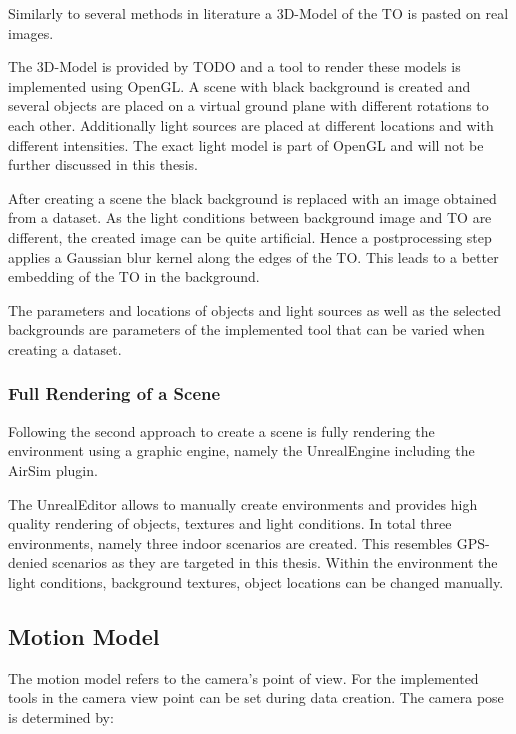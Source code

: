 Similarly to several methods in literature \cite{Girshick2013, Peng, Rozantsev} a 3D-Model of the \ac{TO} is pasted on real images.

The 3D-Model is provided by TODO and a tool to render these models is implemented using OpenGL. A scene with black background is created and several objects are placed on a virtual ground plane with different rotations to each other. Additionally light sources are placed at different locations and with different intensities. The exact light model is part of OpenGL and will not be further discussed in this thesis. 

After creating a scene the black background is replaced with an image obtained from a dataset. As the light conditions between background image and \ac{TO} are different, the created image can be quite artificial. Hence a postprocessing step applies a Gaussian blur kernel along the edges of the \ac{TO}. This leads to a better embedding of the \ac{TO} in the background.

The parameters and locations of objects and light sources as well as the selected backgrounds are parameters of the implemented tool that can be varied when creating a dataset.

\subsubsection{Full Rendering of a Scene}

Following \cite{Ros2016, Gaidon2016, Johnson-Roberson2016, Tobin2017, Tremblay2018a} the second approach to create a scene is fully rendering the environment using a graphic engine, namely the UnrealEngine including the AirSim plugin.

The UnrealEditor allows to manually create environments and provides high quality rendering of objects, textures and light conditions. In total three environments, namely three indoor scenarios are created. This resembles GPS-denied scenarios as they are targeted in this thesis. Within the environment the light conditions, background textures, object locations can be changed manually.

\subsection{Motion Model}

The motion model refers to the camera's point of view. For the implemented tools in  the camera view point can be set during data creation. The camera pose is determined by:

